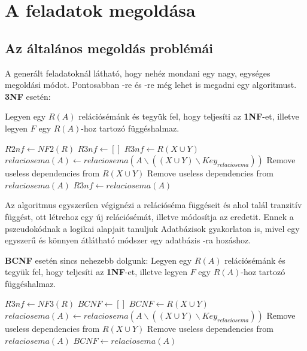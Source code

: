 \chapter{A feladatok megoldása}

\section{Az általános megoldás problémái}

A generált feladatoknál látható, hogy nehéz mondani egy nagy, egységes megoldási módot. Pontosabban \nfh-re és \BCNF-re még lehet is megadni egy algoritmust. \textbf{3NF} esetén: \par
Legyen egy $R(A)$ relációsémánk és tegyük fel, hogy teljesíti az \textbf{1NF}-et, illetve legyen $F$ egy $R(A)$-hoz tartozó függéshalmaz.
\hfill \break
\begin{algorithmic}
        \State $R2nf \gets NF2(R)$
        \State $R3nf \gets []$
                    \State $R3nf \gets R(X\cup Y)$
                    \State $relaciosema(A) \gets relaciosema(A \backslash ((X\cup Y) \backslash Key_{relaciosema}))$ 
                    \State Remove useless dependencies from $R(X \cup Y)$
                \EndIf
            \EndFor
            \State Remove useless dependencies from $relaciosema(A)$
            \State $R3nf \gets relaciosema(A)$
        \EndFor
    \EndFunction
\end{algorithmic}
\hfill \break
Az algoritmus egyszerűen végignézi a relációséma függéseit és ahol talál tranzitív függést, ott létrehoz egy új relációsémát, illetve módosítja az eredetit. Ennek a pszeudokódnak a logikai alapjait tanuljuk Adatbázisok gyakorlaton is, mivel egy egyszerű és könnyen átlátható módszer egy adatbázis \nfh-ra hozáshoz. \par
\textbf{BCNF} esetén sincs nehezebb dolgunk:
Legyen egy $R(A)$ relációsémánk és tegyük fel, hogy teljesíti az \textbf{1NF}-et, illetve legyen $F$ egy $R(A)$-hoz tartozó függéshalmaz.
\hfill \break
\begin{algorithmic}
        \State $R3nf \gets NF3(R)$
        \State $BCNF \gets []$
                    \State $BCNF \gets R(X\cup Y)$
                    \State $relaciosema(A) \gets relaciosema(A \backslash ((X\cup Y) \backslash Key_{relaciosema}))$ 
                    \State Remove useless dependencies from $R(X \cup Y)$
                \EndIf
            \EndFor
            \State Remove useless dependencies from $relaciosema(A)$
            \State $BCNF \gets relaciosema(A)$
        \EndFor
    \EndFunction
\end{algorithmic}
